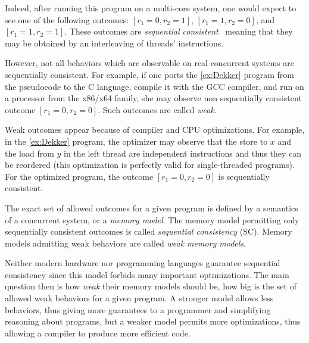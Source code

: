 Indeed, after running this program on a multi-core system, one would expect to see 
one of the following outcomes: $[r_1=0, r_2=1]$, $[r_1=1,r_2=0]$, and $[r_1=1,r_2=1]$.
These outcomes are \emph{sequential consistent}~\cite{Lamport:TC79} meaning
that they may be obtained by an interleaving of threads' instructions.



However, not all behaviors which are observable on real concurrent systems are sequentially consistent. 
For example, if one ports the \ref{ex:Dekker} program
from the pseudocode to the C language, compile it with the GCC compiler, 
and run on a processor from the x86/x64 family,
she may observe non sequentially consistent outcome $[r_1=0, r_2=0]$.
Such outcomes are called \emph{weak}.

Weak outcomes appear because of compiler and CPU optimizations.
For example, in the \ref{ex:Dekker} program,
the optimizer may observe that the store to $x$ and the load from $y$ in the left thread
are independent instructions and thus they can be reordered
(this optimization is perfectly valid for single-threaded programs).
For the optimized program, the outcome $[r_1=0, r_2=0]$
is sequentially consistent.

The exact set of allowed outcomes for a given program 
is defined by a semantics of a concurrent system, or a \emph{memory model}.
The memory model permitting only sequentially consistent outcomes 
is called \emph{sequential consistency} (SC).
Memory models admitting weak behaviors are called \emph{weak memory models}.

Neither modern hardware nor programming languages 
guarantee sequential consistency since this model forbids many important optimizations.
The main question then is how \emph{weak} their memory models should be,
\ie how big is the set of allowed weak behaviors for a given program.
A stronger model allows less behaviors, thus giving more guarantees to a programmer
and simplifying reasoning about programs, but a weaker model permits more optimizations,
thus allowing a compiler to produce more efficient code.

